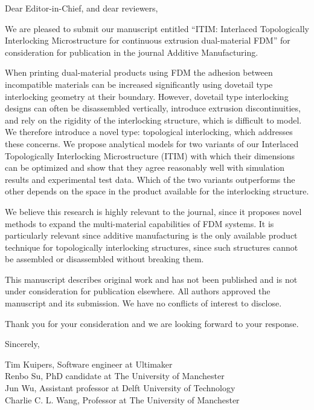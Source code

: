 \documentclass[a4paper,12pt]{letter}
\begin{document}
\begin{letter}{}


\vspace*{-5\baselineskip}%

\opening{
\vspace*{-1\baselineskip}%
Dear Editor-in-Chief, and dear reviewers,
}


We are pleased to submit our manuscript entitled ``ITIM: Interlaced Topologically Interlocking Microstructure for continuous extrusion dual-material FDM''
for consideration for publication in the journal Additive Manufacturing.

When printing dual-material products using FDM the adhesion between incompatible materials can be increased significantly using dovetail type interlocking geometry at their boundary.
However, dovetail type interlocking designs can often be disassembled vertically, introduce extrusion discontinuities, and rely on the rigidity of the interlocking structure, which is difficult to model.
We therefore introduce a novel type: topological interlocking, which addresses these concerns.
We propose analytical models for two variants of our Interlaced Topologically Interlocking Microstructure (ITIM) with which their dimensions can be optimized
and show that they agree reasonably well with simulation results and experimental test data.
Which of the two variants outperforms the other depends on the space in the product available for the interlocking structure.

We believe this research is highly relevant to the journal, since it proposes novel methods to expand the multi-material capabilities of FDM systems.
It is particularly relevant since additive manufacturing is the only available product technique for topologically interlocking structures,
since such structures cannot be assembled or disassembled without breaking them.

This manuscript describes original work and has not been published and is not under consideration for publication elsewhere. 
All authors approved the manuscript and its submission. We have no conflicts of interest to disclose.

Thank you for your consideration and we are looking forward to your response.

\bigskip 

Sincerely,

\bigskip 
Tim Kuipers, Software engineer at Ultimaker \\
Renbo Su, PhD candidate at The University of Manchester\\
Jun Wu, Assistant professor at Delft University of Technology \\
Charlie C. L. Wang, Professor at The University of Manchester



\end{letter}
\end{document}
